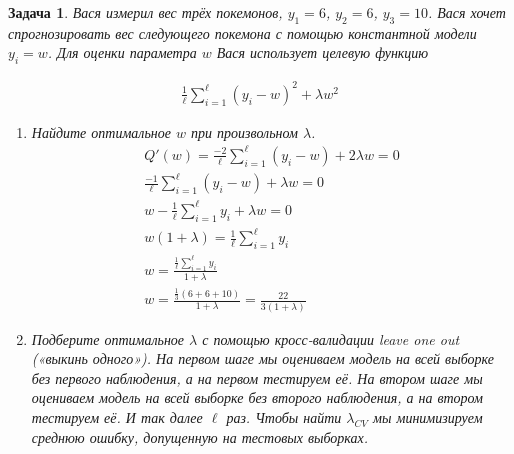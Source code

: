 \documentclass[12pt,fleqn]{article}
\newtheorem{esProblem}{Задача}
\begin{document}
\begin{esProblem}
Вася измерил вес трёх покемонов,  $y_1=6$, $y_2=6$, $y_3=10$.  Вася хочет спрогнозировать вес следующего покемона с помощью константной модели $y_i = w$. Для оценки параметра $w$ Вася использует целевую функцию

\begin{gather*}
\frac{1}{\ell}\sum_{i=1}^{\ell} (y_i - w)^2 + \lambda w^2
\end{gather*} 

\begin{enumerate}
    \item Найдите оптимальное $w$ при произвольном $\lambda$.
    \begin{gather*}
    Q'(w) = \frac{-2}{\ell}\sum_{i=1}^{\ell} (y_i - w) + 2 \lambda w = 0 \\
    	\frac{-1}{\ell}\sum_{i=1}^{\ell} (y_i - w) + \lambda w = 0 \\
    	w - \frac{1}{\ell}\sum_{i=1}^{\ell} y_i + \lambda w = 0 \\
    	w (1 + \lambda) = \frac{1}{\ell}\sum_{i=1}^{\ell} y_i \\
    	w = \frac{\frac{1}{\ell}\sum_{i=1}^{\ell} y_i}{1 + \lambda} \\
    	w = \frac{\frac{1}{3}(6+6+10)}{1 + \lambda} = \frac{22}{3(1+\lambda)}
    \end{gather*}
    \item Подберите оптимальное $\lambda$ с помощью кросс-валидации leave one out («выкинь одного»). На первом шаге мы оцениваем модель на всей выборке без первого наблюдения, а на первом тестируем её. На втором шаге мы оцениваем модель на всей выборке без второго наблюдения, а на втором тестируем её. И так далее $\ell$ раз. Чтобы найти $\lambda_{CV}$ мы минимизируем среднюю ошибку, допущенную на тестовых выборках.
    

\end{enumerate}
\end{esProblem}
\end{document}
